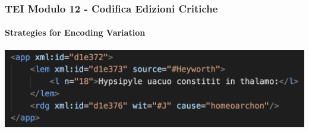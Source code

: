 \begin{frame}
    \frametitle{TEI Modulo 12 - Codifica Edizioni Critiche}
    \framesubtitle{Strategies for Encoding Variation}
    \addtocounter{nframe}{1}
    






    \begin{center}
       \includegraphics[width=.95\textwidth]{imgs/app-omeoarchia.png}
    \end{center}

\end{frame}




